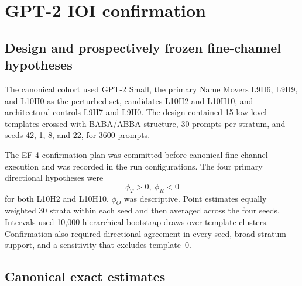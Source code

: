 \documentclass[pdflatex,sn-apa]{sn-jnl}
\begin{document}
\section{GPT-2 IOI confirmation}

\subsection{Design and prospectively frozen fine-channel hypotheses}

The canonical cohort used GPT-2 Small, the primary Name Movers L9H6, L9H9, and
L10H0 as the perturbed set, candidates L10H2 and L10H10, and architectural controls
L9H7 and L9H0. The design contained 15 low-level templates crossed with BABA/ABBA
structure, 30 prompts per stratum, and seeds 42, 1, 8, and 22, for 3600 prompts.

The EF-4 confirmation plan was committed before canonical fine-channel
execution and was recorded in the run configurations. The four primary
directional hypotheses were
\[
\phi_T>0,\ \phi_R<0
\]
for both L10H2 and L10H10. $\phi_O$ was descriptive. Point estimates equally
weighted 30 strata within each seed and then averaged across the four seeds.
Intervals used 10{,}000 hierarchical bootstrap draws over template clusters.
Confirmation also required directional agreement in every seed, broad stratum
support, and a sensitivity that excludes template~0.

\subsection{Canonical exact estimates}
\end{document}
